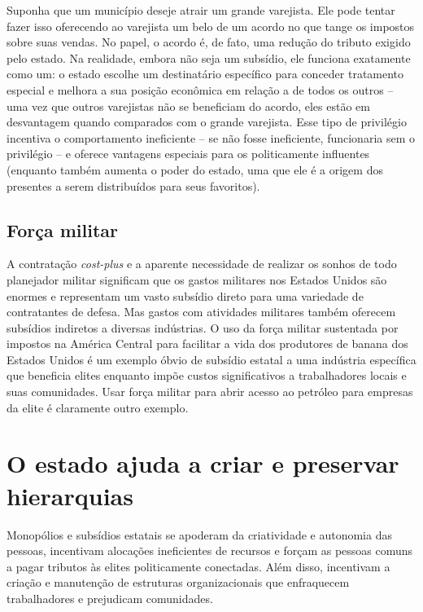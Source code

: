 Suponha que um município deseje atrair um grande varejista. Ele pode tentar fazer isso oferecendo ao varejista um belo de um acordo no que tange os impostos sobre suas vendas. No papel, o acordo é, de fato, uma redução do tributo exigido pelo estado. Na realidade, embora não seja um subsídio, ele funciona exatamente como um: o estado escolhe um destinatário específico para conceder tratamento especial e melhora a sua posição econômica em relação a de todos os outros -- uma vez que outros varejistas não se beneficiam do acordo, eles estão em desvantagem quando comparados com o grande varejista. Esse tipo de privilégio incentiva o comportamento ineficiente -- se não fosse ineficiente, funcionaria sem o privilégio -- e oferece vantagens especiais para os politicamente influentes (enquanto também aumenta o poder do estado, uma que ele é a origem dos presentes a serem distribuídos para seus favoritos).

\subsection*{Força militar}

A contratação \emph{cost-plus} e a aparente necessidade de realizar os sonhos de todo planejador militar significam que os gastos militares nos Estados Unidos são enormes e representam um vasto subsídio direto para uma variedade de contratantes de defesa. Mas gastos com atividades militares também oferecem subsídios indiretos a diversas indústrias. O uso da força militar sustentada por impostos na América Central para facilitar a vida dos produtores de banana dos Estados Unidos é um exemplo óbvio de subsídio estatal a uma indústria específica que beneficia elites enquanto impõe custos significativos a trabalhadores locais e suas comunidades. Usar força militar para abrir acesso ao petróleo para empresas da elite é claramente outro exemplo.

\section{O estado ajuda a criar e preservar hierarquias}

Monopólios e subsídios estatais se apoderam da criatividade e autonomia das pessoas, incentivam alocações ineficientes de recursos e forçam as pessoas comuns a pagar tributos às elites politicamente conectadas. Além disso, incentivam a criação e manutenção de estruturas organizacionais que enfraquecem trabalhadores e prejudicam comunidades.


